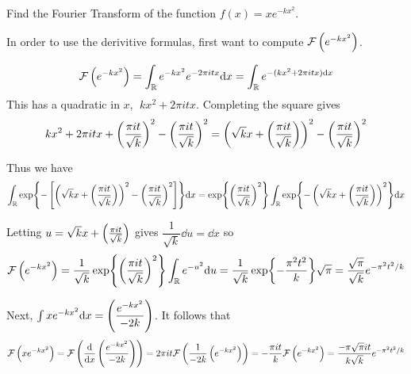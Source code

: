 Find the Fourier Transform of the function $f(x) = xe^{-kx^2}$. 

\soln* 

\nnl In order to use the derivitive formulas, first want to compute $\mathcal{F}\pars{e^{-kx^2}}$.

$$\mathcal{F}\pars{e^{-kx^2}} = \intreal e^{-kx^2}e^{-2\pi i t x}\dd x = \intreal e^{-(kx^2 + 2\pi i tx) \dd x}$$
This has a quadratic in $x$, $\;kx^2 + 2\pi i tx$. Completing the square gives 
$$kx^2 + 2\pi i tx + \pfrac{\pi i t}{\sqrt{k}}^2 - \pfrac{\pi i t}{\sqrt{k}}^2 = \pars{\sqrt{k}x + \pfrac{\pi i t}{\sqrt{k}}}^2 - \pfrac{\pi i t}{\sqrt{k}}^2$$

Thus we have 
$$ \intreal \exp{ -\brac{\pars{\sqrt{k}x + \pfrac{\pi i t}{\sqrt{k}}}^2 - \pfrac{\pi i t}{\sqrt{k}}^2}} \dd x = \exp{\pfrac{\pi i t}{\sqrt{k}}^2} \intreal \exp{-\pars{\sqrt{k}x + \pfrac{\pi i t}{\sqrt{k}}}^2}\dd x $$

Letting $u = \sqrt{k}x + \pfrac{\pi i t}{\sqrt{k}}$ gives $\dfrac{1}{\sqrt{k}} \dd u = \dd x$ so 
$$\mathcal{F}\pars{e^{-kx^2}} = \frac{1}{\sqrt{k}} \exp{\pfrac{\pi i t}{\sqrt{k}}^2} \intreal e^{-u^2} \dd u = \frac{1}{\sqrt{k}} \exp{ -\frac{\pi^2 t^2}{k}}  \sqrt{\pi} =  \frac{\sqrt{\pi}}{\sqrt{k}} e^{-\pi^2 t^2 / k}$$

\nnl Next, $\int xe^{-kx^2} \dd x= \pfrac*{e^{-kx^2}}{-2k}$. It follows that 
$$\mathcal{F}\pars{xe^{-kx^2}} = \mathcal{F}\pars{\dv{x}\pfrac{e^{-kx^2}}{-2k}} = 2\pi i t \mathcal{F}\pars{ \over{-2k}\pars{e^{-kx^2}}} =- \frac{\pi i t}{k} \mathcal{F}\pars{ e^{-kx^2}} = \frac{- \pi \sqrt{\pi} i t}{k\sqrt{k}} e^{-\pi^2 t^2 / k}$$
